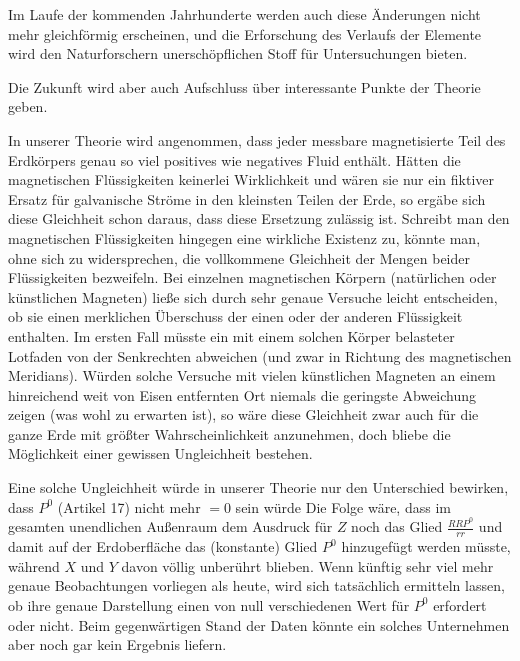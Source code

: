 Im Laufe der kommenden Jahrhunderte werden auch diese Änderungen nicht mehr gleichförmig erscheinen, und die Erforschung des Verlaufs der Elemente wird den Naturforschern unerschöpflichen Stoff für Untersuchungen bieten.

Die Zukunft wird aber auch Aufschluss über interessante Punkte der Theorie geben.

In unserer Theorie wird angenommen, dass jeder messbare magnetisierte Teil des Erdkörpers genau so viel positives wie negatives Fluid enthält. Hätten die magnetischen Flüssigkeiten keinerlei Wirklichkeit und wären sie nur ein fiktiver Ersatz für galvanische Ströme in den kleinsten Teilen der Erde, so ergäbe sich diese Gleichheit schon daraus, dass diese Ersetzung zulässig ist. Schreibt man den magnetischen Flüssigkeiten hingegen eine wirkliche Existenz zu, könnte man, ohne sich zu widersprechen, die vollkommene Gleichheit der Mengen beider Flüssigkeiten bezweifeln. Bei einzelnen magnetischen Körpern (natürlichen oder künstlichen Magneten) ließe sich durch sehr genaue Versuche leicht entscheiden, ob sie einen merklichen Überschuss der einen oder der anderen Flüssigkeit enthalten. Im ersten Fall müsste ein mit einem solchen Körper belasteter Lotfaden von der Senkrechten abweichen (und zwar in Richtung des magnetischen Meridians). Würden solche Versuche mit vielen künstlichen Magneten an einem hinreichend weit von Eisen entfernten Ort niemals die geringste Abweichung zeigen (was wohl zu erwarten ist), so wäre diese Gleichheit zwar auch für die ganze Erde mit größter Wahrscheinlichkeit anzunehmen, doch bliebe die Möglichkeit einer gewissen Ungleichheit bestehen.

Eine solche Ungleichheit würde in unserer Theorie nur den Unterschied bewirken, dass $P^0$ (Artikel 17) nicht mehr $=0$ sein würde Die Folge wäre, dass im gesamten unendlichen Außenraum dem Ausdruck für $Z$ noch das Glied $\frac{RRP^0}{rr}$ und damit auf der Erdoberfläche das (konstante) Glied $P^0$ hinzugefügt werden müsste, während $X$ und $Y$ davon völlig unberührt blieben. Wenn künftig sehr viel mehr genaue Beobachtungen vorliegen als heute, wird sich tatsächlich ermitteln lassen, ob ihre genaue Darstellung einen von null verschiedenen Wert für $P^0$ erfordert oder nicht. Beim gegenwärtigen Stand der Daten könnte ein solches Unternehmen aber noch gar kein Ergebnis liefern.
